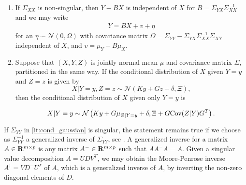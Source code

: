 \begin{lemma}
\begin{enumerate}
        \item If $\Sigma_{XX}$ is non-singular, then $Y - BX$ is independent of $X$ for $B = \Sigma_{YX} \Sigma_{XX}^{-1}$ and we may write
            \begin{align*}
            Y = BX + v + \eta
            \end{align*}
            for an $\eta \sim \mathcal N(0, \Omega)$ with covariance matrix $\Omega = \Sigma_{YY} - \Sigma_{YX}\Sigma_{XX}^{-1}\Sigma_{XY}$ independent of $X$, and $v = \mu_{Y} - B \mu_{X}$.
        \item Suppose that $(X,Y,Z)$ is jointly normal mean $\mu$ and covariance matrix $\Sigma$, partitioned in the same way. 
        If the conditional distribution of $X$ given $Y = y$ and $Z = z$ is given by 
        $$
        X | Y = y, Z = z \sim \mathcal N(Ky + Gz + \delta, \Xi),
        $$
        then the conditional distribution of $X$ given only $Y = y$ is
        
        $$
        X | Y = y \sim \mathcal N \left(Ky + G \mu_{Z| Y= y} + \delta, \Xi + G\text{Cov} (Z | Y) G^{T}\right).
        $$
        
    \end{enumerate}
\end{lemma}

\begin{remark}
    If $\Sigma_{YY}$ in  \ref{it:cond_gaussian} is singular, the statement remains true if we choose as $\Sigma_{YY}^{-1}$ a generalized inverse of $\Sigma_{YY}$, see \citep[8.a Note 3]{Rao2002Linear}. A generalized inverse for a matrix $A\in\mathbf R^{m \times p}$ is any matrix $A^{-} \in \mathbf R^{m \times p}$ such that $AA^{-}A = A$. Given a singular value decomposition $A = UDV^{T}$, we may obtain the Moore-Penrose inverse $A^{\dagger} = V D^{-}U^{T}$ of $A$, which is a generalized inverse of $A$, by inverting the non-zero diagonal elements of $D$. 
\end{remark}


